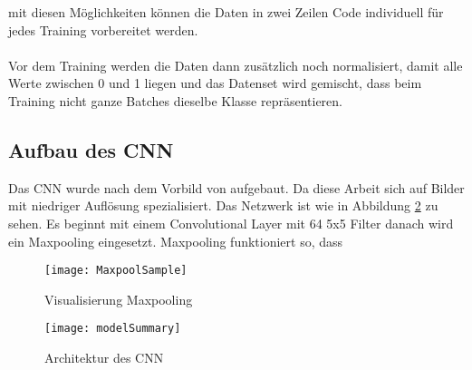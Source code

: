 \noindent mit diesen Möglichkeiten können die Daten in zwei Zeilen Code individuell für jedes Training vorbereitet werden.\\
\\
Vor dem Training werden die Daten dann zusätzlich noch normalisiert, damit alle Werte zwischen 0 und 1 liegen und das Datenset wird gemischt, dass beim Training nicht ganze Batches dieselbe Klasse repräsentieren.

\subsection{Aufbau des CNN}

Das \gls{CNN} wurde nach dem Vorbild von \parencite{cnnArchitecture} aufgebaut. Da diese Arbeit sich auf Bilder mit niedriger Auflösung spezialisiert. Das Netzwerk ist wie in Abbildung \ref{fig:cnnArchitecture} zu sehen. Es beginnt mit einem Convolutional Layer mit 64 5x5 Filter danach wird ein Maxpooling eingesetzt. Maxpooling funktioniert so, dass 

\begin{figure}[H]
	\centering
	\texttt{[image: MaxpoolSample]}
	\caption{Visualisierung Maxpooling \parencite{MaxpoolImg2018} }
	\label{fig:maxpoolSample}
\end{figure}

\begin{figure}[H]
	\centering
	\texttt{[image: modelSummary]}
	\caption{Architektur des CNN}
	\label{fig:cnnArchitecture}
\end{figure}



